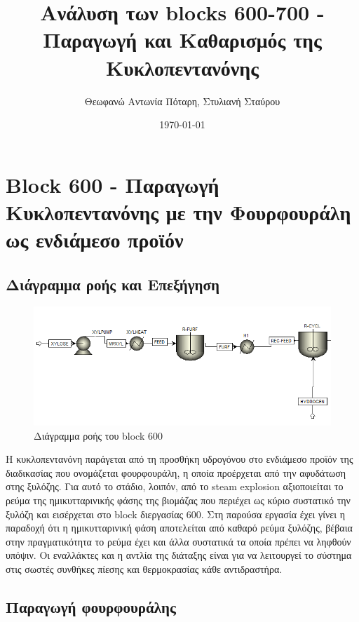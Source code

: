 \documentclass[11pt]{article}
\author{Θεωφανώ Αντωνία Πόταρη, Στυλιανή Σταύρου}
\date{\today}
\title{Ανάλυση των blocks 600-700 - Παραγωγή και Καθαρισμός της Κυκλοπεντανόνης}
\begin{document}
\maketitle
\tableofcontents

\renewcommand{\abstractname}{Περίληψη}
\renewcommand{\tablename}{Πίνακας}
\renewcommand{\figurename}{Σχήμα}
\renewcommand\listingscaption{Κώδικας}

\section{Block 600 - Παραγωγή Κυκλοπεντανόνης με την Φουρφουράλη ως ενδιάμεσο προϊόν}
\label{sec:org96b5c84}

\subsection{Διάγραμμα ροής και Επεξήγηση}
\label{sec:orgb959a8f}
\begin{figure}[htbp]
\centering
\includegraphics[width=.9\linewidth]{Block_600_-_Παραγωγή_Κυκλοπεντανόνης_με_την_Φουρφουράλη_ως_ενδιάμεσο_προϊόν/2023-01-13_17-51-52_screenshot.png}
\caption{Διάγραμμα ροής του block 600}
\end{figure}

Η κυκλοπεντανόνη παράγεται από τη προσθήκη υδρογόνου στο ενδιάμεσο
προϊόν της διαδικασίας που ονομάζεται φουρφουράλη, η οποία προέρχεται
από την αφυδάτωση στης ξυλόζης. Για αυτό το στάδιο, λοιπόν, από το steam
explosion αξιοποιείται το ρεύμα της ημικυτταρινικής φάσης της βιομάζας
που περιέχει ως κύριο συστατικό την ξυλόζη και εισέρχεται στο block
διεργασίας 600. Στη παρούσα εργασία έχει γίνει η παραδοχή ότι η
ημικυτταρινική φάση αποτελείται από καθαρό ρεύμα ξυλόζης, βέβαια στην
πραγματικότητα το ρεύμα έχει και άλλα συστατικά τα οποία πρέπει να
ληφθούν υπόψιν. Οι εναλλάκτες και η αντλία της διάταξης είναι για να λειτουργεί το σύστημα στις σωστές συνθήκες πίεσης και θερμοκρασίας κάθε αντιδραστήρα.

\subsection{Παραγωγή φουρφουράλης}
\label{sec:org7b0e428}
\end{document}
